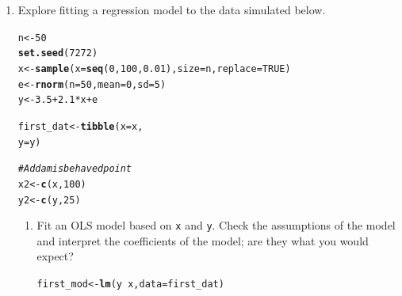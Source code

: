 \documentclass{article}\usepackage[]{graphicx}\usepackage[]{xcolor}
\makeatletter
\newcommand{\hlnum}[1]{\textcolor[rgb]{0.686,0.059,0.569}{#1}}%
\newcommand{\hlcom}[1]{\textcolor[rgb]{0.678,0.584,0.686}{\textit{#1}}}%
\newcommand{\hlopt}[1]{\textcolor[rgb]{0,0,0}{#1}}%
\newcommand{\hldef}[1]{\textcolor[rgb]{0.345,0.345,0.345}{#1}}%
\newcommand{\hlkwb}[1]{\textcolor[rgb]{0.69,0.353,0.396}{#1}}%
\newcommand{\hlkwc}[1]{\textcolor[rgb]{0.333,0.667,0.333}{#1}}%
\newcommand{\hlkwd}[1]{\textcolor[rgb]{0.737,0.353,0.396}{\textbf{#1}}}%
\newenvironment{kframe}{%
 \def\at@end@of@kframe{}%
 \ifinner\ifhmode%
  \def\at@end@of@kframe{\end{minipage}}%
  \begin{minipage}{\columnwidth}%
 \fi\fi%
 \def\FrameCommand##1{\hskip\@totalleftmargin \hskip-\fboxsep
 \colorbox{shadecolor}{##1}\hskip-\fboxsep
     \hskip-\linewidth \hskip-\@totalleftmargin \hskip\columnwidth}%
 \MakeFramed {\advance\hsize-\width
   \@totalleftmargin\z@ \linewidth\hsize
   \@setminipage}}%
 {\par\unskip\endMakeFramed%
 \at@end@of@kframe}
\newenvironment{knitrout}{}{} %
\makeatother
\begin{document}
\begin{enumerate}
\begin{enumerate}
\begin{enumerate}
  \end{enumerate}
\end{enumerate}
\item Explore fitting a regression model to the data simulated below.
\begin{knitrout}\scriptsize
{}\color{fgcolor}\begin{kframe}
\begin{alltt}
\hldef{n} \hlkwb{<-} \hlnum{50}
\hlkwd{set.seed}\hldef{(}\hlnum{7272}\hldef{)}
\hldef{x} \hlkwb{<-} \hlkwd{sample}\hldef{(}\hlkwc{x}\hldef{=}\hlkwd{seq}\hldef{(}\hlnum{0}\hldef{,}\hlnum{100}\hldef{,}\hlnum{0.01}\hldef{),} \hlkwc{size}\hldef{=n,} \hlkwc{replace}\hldef{=}\hlnum{TRUE}\hldef{)}
\hldef{e} \hlkwb{<-} \hlkwd{rnorm}\hldef{(}\hlkwc{n}\hldef{=}\hlnum{50}\hldef{,} \hlkwc{mean}\hldef{=}\hlnum{0}\hldef{,} \hlkwc{sd}\hldef{=}\hlnum{5}\hldef{)}
\hldef{y} \hlkwb{<-} \hlnum{3.5} \hlopt{+} \hlnum{2.1}\hlopt{*}\hldef{x} \hlopt{+} \hldef{e}

\hldef{first_dat} \hlkwb{<-} \hlkwd{tibble}\hldef{(}\hlkwc{x} \hldef{= x,}
                    \hlkwc{y} \hldef{= y)}

\hlcom{# Add a misbehaved point}
\hldef{x2} \hlkwb{<-} \hlkwd{c}\hldef{(x,} \hlnum{100}\hldef{)}
\hldef{y2} \hlkwb{<-} \hlkwd{c}\hldef{(y,} \hlnum{25}\hldef{)}
\end{alltt}
\end{kframe}
\end{knitrout}
\begin{enumerate}
	\item Fit an OLS model based on \texttt{x} and \texttt{y}. Check the assumptions of the model and interpret the 
	coefficients of the model; are they what you would expect?
	
\begin{knitrout}\scriptsize
{}\color{fgcolor}\begin{kframe}
\begin{alltt}
\hldef{first_mod} \hlkwb{<-} \hlkwd{lm}\hldef{(y} \hlopt{~} \hldef{x,} \hlkwc{data} \hldef{= first_dat)}
\end{alltt}
\end{kframe}
\end{knitrout}
	

\end{enumerate}
\end{enumerate}
\end{document}
